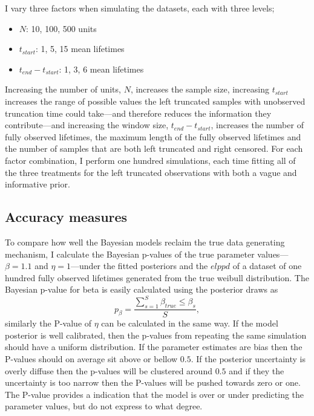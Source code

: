 I vary three factors when simulating the datasets, each with three levels;
\begin{itemize}
    \item $N$: 10, 100, 500 units
    \item $t_{start}$: 1, 5, 15 mean lifetimes
    \item $t_{end} - t_{start}$: 1, 3, 6 mean lifetimes
\end{itemize}
Increasing the number of units, $N$, increases the sample size, increasing $t_{start}$ increases the range of possible values the left truncated samples with unobserved truncation time could take---and therefore reduces the information they contribute---and increasing the window size, $t_{end} - t_{start}$, increases the number of fully observed lifetimes, the maximum length of the fully observed lifetimes and the number of samples that are both left truncated and right censored. For each factor combination, I perform one hundred simulations, each time fitting all of the three treatments for the left truncated observations with both a vague and informative prior.

\subsection{Accuracy measures}

To compare how well the Bayesian models reclaim the true data generating mechanism, I calculate the Bayesian p-values of the true parameter values---$\beta = 1.1$ and $\eta = 1$---under the fitted posteriors and the $elppd$ of a dataset of one hundred fully observed lifetimes generated from the true weibull distribution. The Bayesian p-value for beta is easily calculated using the posterior draws as
\begin{equation*}
    p_{\beta} = \frac{\sum^{S}_{s = 1}{\beta_{true} \le \beta_s}}{S},
\end{equation*}
similarly the P-value of $\eta$ can be calculated in the same way. If the model posterior is well calibrated, then the p-values from repeating the same simulation should have a uniform distribution. If the parameter estimates are bias then the P-values should on average sit above or bellow $0.5$. If the posterior uncertainty is overly diffuse then the p-values will be clustered around $0.5$ and if they the uncertainty is too narrow then the P-values will be pushed towards zero or one. The P-value provides a indication that the model is over or under predicting the parameter values, but do not express to what degree.

